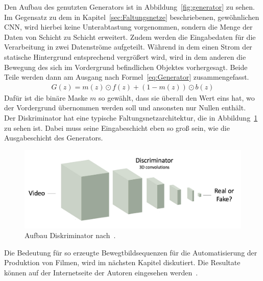 \documentclass[times, 11pt,twocolumn]{article}
\begin{document}
Den Aufbau des genutzten Generators \cite{VondrickPT16} ist in Abbildung~\ref{fig:generator} zu sehen. Im Gegensatz zu dem in Kapitel~\ref{sec:Faltungsnetze} beschriebenen, gewöhnlichen CNN, wird hierbei keine Unterabtastung vorgenommen, sondern die Menge der Daten von Schicht zu Schicht erweitert. Zudem werden die Eingabedaten für die Verarbeitung in zwei Datenströme aufgeteilt. Während in dem einen Strom der statische Hintergrund entsprechend vergrößert wird, wird in dem anderen die Bewegung des sich im Vordergrund befindlichen Objektes vorhergesagt. Beide Teile werden dann am Ausgang nach Formel~\ref{eq:Generator} zusammengefasst.
\footnotesize
\begin{equation}
\begin{aligned}
G(z) = m(z) \odot f(z) + (1-m(z))\odot b(z)
\end{aligned}
	\label{eq:Generator}
\end{equation}
\small
Dafür ist die binäre Maske $m$ so gewählt, dass sie überall den Wert eins hat, wo der Vordergrund übernommen werden soll und ansonsten nur Nullen enthält. \\
Der Diskriminator hat eine typische Faltungsnetzarchitektur, die in Abbildung~\ref{fig:discriminator} zu sehen ist. Dabei muss seine Eingabeschicht eben so groß sein, wie die Ausgabeschicht des Generators.\\
\begin{figure}
	\flushleft
	\includegraphics[width=\columnwidth]{Bilder/discriminator.jpg}
	\caption{Aufbau Diskriminator nach~\cite{VondrickPT16}.}
	\label{fig:discriminator}
\end{figure}
Die Bedeutung für so erzeugte Bewegtbildsequenzen für die Automatisierung der Produktion von Filmen, wird im nächsten Kapitel diskutiert. Die Resultate können auf der Internetseite der Autoren eingesehen werden~\cite{VondrickInternet}.
\end{document}

